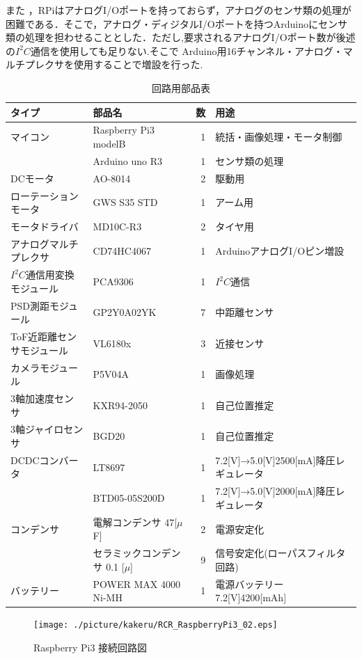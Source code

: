 \documentclass[11pt,a4]{jsarticle}
\begin{document}
また ，RPiはアナログI/Oポートを持っておらず，アナログのセンサ類の処理が困難である．そこで，アナログ・ディジタルI/Oポートを持つArduinoにセンサ類の処理を担わせることとした．ただし,要求されるアナログI/Oポート数が後述の$I^2 C$通信を使用しても足りない.そこで
Arduino用16チャンネル・アナログ・マルチプレクサを使用することで増設を行った.
\begin{table}[h]
  \centering
  \caption{回路用部品表}
  \begin{tabular}{|l|l|r||l|} \hline
    タイプ & 部品名 & 数 & 用途 \\ \hline \hline
     マイコン & Raspberry Pi3 modelB& 1& 統括・画像処理・モータ制御 \\ \cline{2-4}
   　　& Arduino uno R3& 1 & センサ類の処理 \\ \hline
     DCモータ & AO-8014 & 2 & 駆動用 \\ \hline
     ローテーションモータ & GWS S35 STD & 1&アーム用  \\ \hline
    モータドライバ& MD10C-R3 & 2& タイヤ用 \\ \hline
   アナログマルチプレクサ & CD74HC4067 & 1 & ArduinoアナログI/Oピン増設 \\ \hline
    $I^2 C$通信用変換モジュール&PCA9306&1&$I^2 C$通信\\ \hline
     PSD測距モジュール& GP2Y0A02YK &7&中距離センサ\\ \hline
      ToF近距離センサモジュール& VL6180x&3&近接センサ \\ \hline
     カメラモジュール&P5V04A&1&画像処理\\ \hline
     3軸加速度センサ&KXR94-2050&1&自己位置推定\\ \hline
     3軸ジャイロセンサ&BGD20&1&自己位置推定\\ \hline
    DCDCコンバータ&LT8697&1& 7.2[V]→5.0[V]2500[mA]降圧レギュレータ\\ \cline{2-4}
       &BTD05-05S200D&1&7.2[V]→5.0[V]2000[mA]降圧レギュレータ\\ \hline
    コンデンサ&電解コンデンサ 47[$\mu$F]&2&電源安定化\\ \cline{2-4}
            &セラミックコンデンサ 0.1 [$\mu$]&9&信号安定化(ローパスフィルタ回路)\\ \hline
   バッテリー&POWER MAX 4000 Ni-MH&1&電源バッテリー 7.2[V]4200[mAh]\\ \hline

  \end{tabular}
  \label{tab:c_parts}
\end{table}
\newpage
\begin{figure}[h]
 \centering
 \texttt{[image: ./picture/kakeru/RCR\_RaspberryPi3\_02.eps]}
    \caption{Raspberry Pi3 接続回路図}
    \label{c_raspberry}
\end{figure}
\end{document}

